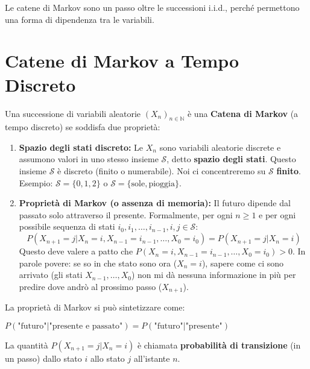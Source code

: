 Le catene di Markov sono un passo oltre le successioni i.i.d., perché permettono una forma di dipendenza tra le variabili.

\section{Catene di Markov a Tempo Discreto}

\begin{definition}
Una successione di variabili aleatorie $(X_n)_{n \in \mathbb{N}}$ è una \textbf{Catena di Markov} (a tempo discreto) se soddisfa due proprietà:
\begin{enumerate}
    \item \textbf{Spazio degli stati discreto:} Le $X_n$ sono variabili aleatorie discrete e assumono valori in uno stesso insieme $\mathcal{S}$, detto \textbf{spazio degli stati}. Questo insieme $\mathcal{S}$ è discreto (finito o numerabile). Noi ci concentreremo su $\mathcal{S}$ \textbf{finito}.
    Esempio: $\mathcal{S} = \{0, 1, 2\}$ o $\mathcal{S} = \{\text{sole}, \text{pioggia}\}$.
    \item \textbf{Proprietà di Markov (o assenza di memoria):} Il futuro dipende dal passato solo attraverso il presente. Formalmente, per ogni $n \ge 1$ e per ogni possibile sequenza di stati $i_0, i_1, \dots, i_{n-1}, i, j \in \mathcal{S}$:
    \begin{equation}
        P(X_{n+1}=j | X_n=i, X_{n-1}=i_{n-1}, \dots, X_0=i_0) = P(X_{n+1}=j | X_n=i)
    \end{equation}
    Questo deve valere a patto che $P(X_n=i, X_{n-1}=i_{n-1}, \dots, X_0=i_0) > 0$.
    In parole povere: se so in che stato sono ora ($X_n=i$), sapere come ci sono arrivato (gli stati $X_{n-1}, \dots, X_0$) non mi dà nessuna informazione in più per predire dove andrò al prossimo passo ($X_{n+1}$).
\end{enumerate}
\end{definition}

\begin{remark}
La proprietà di Markov si può sintetizzare come:
\begin{center}
    $P(\text{"futuro"} | \text{"presente e passato"}) = P(\text{"futuro"} | \text{"presente"})$
\end{center}
\end{remark}

La quantità $P(X_{n+1}=j | X_n=i)$ è chiamata \textbf{probabilità di transizione} (in un passo) dallo stato $i$ allo stato $j$ all'istante $n$.

